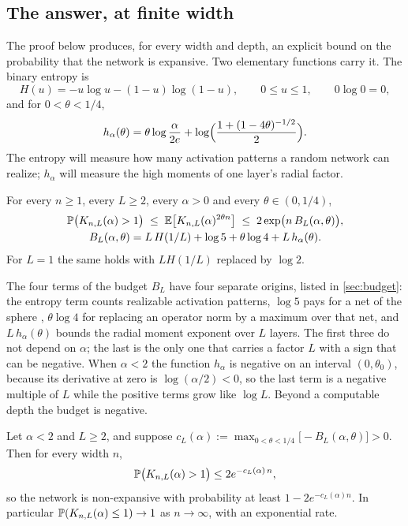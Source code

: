 \subsection{The answer, at finite width}

The proof below produces, for every width and depth, an explicit bound on the probability that the network is expansive. Two elementary functions carry it. The binary entropy is
\[
H(u)=-u\log u-(1-u)\log(1-u),\qquad 0\le u\le 1,\qquad 0\log 0=0,
\]
and for $0<\theta<1/4$,
\begin{equation}\label{eq:hdef}
h_\alpha(\theta)=\theta\log\frac{\alpha}{2e}+\log\Bigl(\frac{1+(1-4\theta)^{-1/2}}{2}\Bigr).
\end{equation}
The entropy will measure how many activation patterns a random network can realize; $h_\alpha$ will measure the high moments of one layer's radial factor.

\begin{theorem}\label{thm:finite}
For every $n\ge 1$, every $L\ge 2$, every $\alpha>0$ and every $\theta\in(0,1/4)$,
\begin{equation}\label{eq:main-finite}
\begin{gathered}
\mathbb{P}\bigl(K_{n,L}(\alpha)>1\bigr)\;\le\;\mathbb{E}\bigl[K_{n,L}(\alpha)^{2\theta n}\bigr]\;\le\;2\exp\bigl(n\,B_L(\alpha,\theta)\bigr),\\
B_L(\alpha,\theta)=L\,H(1/L)+\log 5+\theta\log 4+L\,h_\alpha(\theta).
\end{gathered}
\end{equation}
For $L=1$ the same holds with $L H(1/L)$ replaced by $\log 2$.
\end{theorem}

The four terms of the budget $B_L$ have four separate origins, listed in \cref{sec:budget}: the entropy term counts realizable activation patterns, $\log 5$ pays for a net of the sphere \cite{vershynin}, $\theta\log 4$ for replacing an operator norm by a maximum over that net, and $L\,h_\alpha(\theta)$ bounds the radial moment exponent over $L$ layers. The first three do not depend on $\alpha$; the last is the only one that carries a factor $L$ with a sign that can be negative. When $\alpha<2$ the function $h_\alpha$ is negative on an interval $(0,\theta_0)$, because its derivative at zero is $\log(\alpha/2)<0$, so the last term is a negative multiple of $L$ while the positive terms grow like $\log L$. Beyond a computable depth the budget is negative.

\begin{corollary}\label{cor:width}
Let $\alpha<2$ and $L\ge 2$, and suppose $c_L(\alpha):=\max_{0<\theta<1/4}\bigl[-B_L(\alpha,\theta)\bigr]>0$. Then for every width $n$,
\[
\mathbb{P}\bigl(K_{n,L}(\alpha)>1\bigr)\le 2e^{-c_L(\alpha)\,n},
\]
so the network is non-expansive with probability at least $1-2e^{-c_L(\alpha)n}$. In particular $\mathbb{P}(K_{n,L}(\alpha)\le 1)\to 1$ as $n\to\infty$, with an exponential rate.
\end{corollary}

